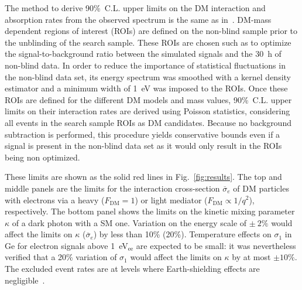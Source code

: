 \documentclass[aps,nofootinbib,floatfix,showpacs,preprintnumbers,twocolumn,superscriptaddress]{revtex4}
\begin{document}
The method to derive 90\%~C.L. upper limits on the DM interaction and absorption rates from the observed spectrum is the same as in~\cite{RED20}. 
DM-mass dependent regions of interest (ROIs) are defined on the non-blind sample prior to the unblinding of the search sample. These ROIs are chosen such as to optimize the signal-to-background ratio between the simulated signals and the 30~h of non-blind data.  In order to reduce the importance of statistical fluctuations in the non-blind data set, its energy spectrum was smoothed with a kernel density estimator and a minimum width of 1~eV was imposed to the ROIs. Once these ROIs are defined for the different DM models and mass values, 90\%~C.L. upper limits on their interaction rates are derived using Poisson statistics, considering all events in the search sample ROIs as DM candidates.
Because no background subtraction is performed, this procedure yields conservative bounds even if a signal is present in the non-blind data set as it would only result in the ROIs being non optimized.

These limits are shown as the solid red lines in Fig.~\ref{fig:results}.
The top and middle panels are the limits for the interaction cross-section ${\overline{\sigma}}_{e}$ of DM particles with electrons via a heavy ($F_{\mathrm{DM}}=1$) or light mediator ($F_{\mathrm{DM}}\propto 1/q^{2}$), respectively.
The bottom panel shows the limits on the kinetic mixing parameter $\kappa$ of a dark photon with a SM one. Variation on the energy scale of $\pm~2\%$ would affect the limits on $\kappa$ (${\overline{\sigma}}_{e}$) by less than 10\% (20\%).
Temperature effects on $\sigma_1$ in Ge for electron signals above 1~eV$_{\mathrm{ee}}$ are expected to be small: it was nevertheless verified that a 20\% variation of $\sigma_1$ would affect the limits on $\kappa$ by at most $\pm10\%$. 
The excluded event rates are at levels where Earth-shielding effects are negligible~\cite{earthshielding}.
\end{document}
